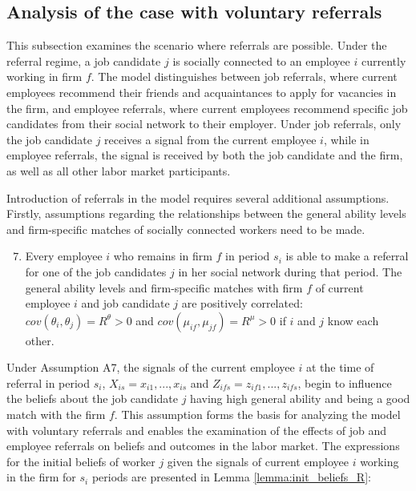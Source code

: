 \documentclass[12pt]{article}
\begin{document}
\subsection{Analysis of the case with voluntary referrals}
This subsection examines the scenario where referrals are possible. Under the referral regime, a job candidate $j$ is socially connected to an employee $i$ currently working in firm $f$. The model distinguishes between job referrals, where current employees recommend their friends and acquaintances to apply for vacancies in the firm, and employee referrals, where current employees recommend specific job candidates from their social network to their employer. Under job referrals, only the job candidate $j$ receives a signal from the current employee $i$, while in employee referrals, the signal is received by both the job candidate and the firm, as well as all other labor market participants.

Introduction of referrals in the model requires several additional assumptions. Firstly, assumptions regarding the relationships between the general ability levels and firm-specific matches of socially connected workers need to be made.

\begin{enumerate}[label={A}{\arabic*}.]
\setcounter{enumi}{6}
\item Every employee $i$ who remains in firm $f$ in period $s_i$ is able to make a referral for one of the job candidates $j$ in her social network during that period. The general ability levels and firm-specific matches with firm $f$ of current employee $i$ and job candidate $j$ are positively correlated: $cov(\theta_{i},\theta_{j})=R^\theta >0$ and $cov(\mu_{if},\mu_{jf})=R^\mu >0$ if $i$ and $j$ know each other.
\end{enumerate}

Under Assumption A7, the signals of the current employee $i$ at the time of referral in period $s_i$, $X_{is} = {x_{i1}, ..., x_{is}}$ and $Z_{ifs} = {z_{if1}, ..., z_{ifs}}$, begin to influence the beliefs about the job candidate $j$ having high general ability and being a good match with the firm $f$. This assumption forms the basis for analyzing the model with voluntary referrals and enables the examination of the effects of job and employee referrals on beliefs and outcomes in the labor market. The expressions for the initial beliefs of worker $j$ given the signals of current employee $i$ working in the firm for $s_i$ periods are presented in Lemma \ref{lemma:init_beliefs_R}:
\end{document}
